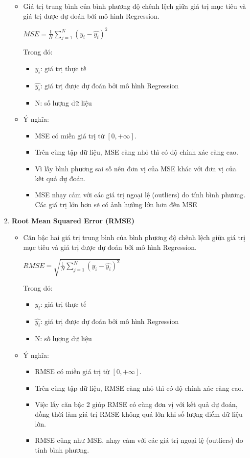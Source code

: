 \begin{enumerate}
\begin{itemize}
\item Giá trị trung bình của bình phương độ chênh lệch giữa giá trị mục tiêu và giá trị được dự đoán bởi mô hình Regression.

\begin{center}
\large $MSE = \frac{1}{N}\sum_{j=1}^{N}(y_{i}-\hat{y_{i}})^2$
\end{center}

Trong đó:
\begin{itemize}
    \item $y_{i}$: giá trị thực tế
    \item $\hat{y_{i}}$: giá trị được dự đoán bởi mô hình Regression
    \item N: số lượng dữ liệu
\end{itemize}
\item Ý nghĩa:
\begin{itemize}
\item MSE có miền giá trị từ $[0,+\infty ]$. 
\item Trên cùng tập dữ liệu, MSE càng nhỏ thì có độ chính xác càng cao. 
\item Vì lấy bình phương sai số nên đơn vị của MSE khác với đơn vị của kết quả dự đoán.
\item MSE nhạy cảm với các giá trị ngoại lệ (outliers) do tính bình phương. Các giá trị lớn hơn sẽ có ảnh hưởng lớn hơn đến MSE
\end{itemize}
\end{itemize}

\item \textbf{Root Mean Squared Error (RMSE)}
\begin{itemize}
\item Căn bậc hai giá trị trung bình của bình phương độ chênh lệch giữa giá trị mục tiêu và giá trị được dự đoán bởi mô hình Regression.
\begin{center}
\large $RMSE = \sqrt{\frac{1}{N}\sum_{j=1}^{N}(y_{i}-\hat{y_{i}})^2}$
\end{center}
Trong đó:
\begin{itemize}
    
    \item $y_{i}$: giá trị thực tế
    \item $\hat{y_{i}}$: giá trị được dự đoán bởi mô hình Regression
    \item N: số lượng dữ liệu
\end{itemize}
\item Ý nghĩa:
\begin{itemize}
\item RMSE có miền giá trị từ $[0,+\infty ]$. 
\item Trên cùng tập dữ liệu, RMSE càng nhỏ thì có độ chính xác càng cao. 
\item Việc lấy căn bậc 2 giúp RMSE có cùng đơn vị với kết quả dự đoán, đồng thời làm giá trị RMSE không quá lớn khi số lượng điểm dữ liệu lớn.
\item RMSE cũng như MSE, nhạy cảm với các giá trị ngoại lệ (outliers) do tính bình phương.
\end{itemize}
\end{itemize}

\end{enumerate}

